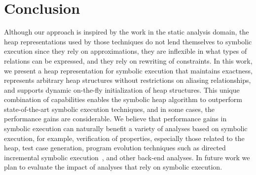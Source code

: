 \section{Conclusion}

Although our approach is inspired by the work in the static analysis
domain, the heap representations used by those techniques do not lend
themselves to symbolic execution since they rely on approximations,
they are inflexible in what types of relations can be expressed, and
they rely on rewriting of constraints.  In this work, we present a
heap representation for symbolic execution that maintains exactness,
represents arbitrary heap structures without restrictions on aliasing
relationships, and supports dynamic on-the-fly initialization of heap
structures. This unique combination of capabilities enables the
symbolic heap algorithm to outperform state-of-the-art symbolic
execution techniques, and in some cases, the performance gains are
considerable. We believe that performance gains in symbolic execution
can naturally benefit a variety of analyses based on symbolic
execution, for example, verification of properties, especially those
related to the heap, test case generation, program evolution
techniques such as directed incremental symbolic
execution~\cite{person:pldi2011}, and other back-end analyses. In
future work we plan to evaluate the impact of analyses that rely on
symbolic execution.

